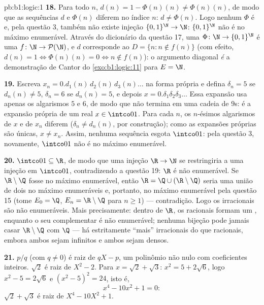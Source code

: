 \begin{solution}{pb:b1:logic:1}
\textbf{18.} Para todo $n$, $d(n) = 1 - \Phi(n)(n) \neq \Phi(n)(n)$,
de modo que as sequências $d$ e $\Phi(n)$ diferem no índice $n$: $d \neq
\Phi(n)$. Logo nenhum $\Phi$ é  e, pela questão 3, também não
existe injeção $\{0,1\}^{\N} \to \N$: $\{0,1\}^{\N}$ não é no
máximo enumerável. Através do dicionário da questão 17, uma 
$\Phi
\colon \N \to \{0,1\}^{\N}$ é uma  $f \colon \N \to
\mathcal{P}(\N)$, e $d$ corresponde ao  $D = \{n : n
\notin f(n)\}$ (com efeito, $d(n) = 1 \iff \Phi(n)(n) = 0 \iff n \notin
f(n)$): o argumento diagonal \emph{é} a demonstração de Cantor do
\cref{exo:b1:logic:11} para $E = \N$.

\textbf{19.} Escreva $x_n = 0.d_1(n)\,d_2(n)\,d_3(n)\dots$ na forma
própria e defina $\delta_n = 5$ se $d_n(n) \neq 5$, $\delta_n = 6$
se $d_n(n) = 5$, e depois $x = 0.\delta_1\delta_2\delta_3\dots$ Essa
expansão usa apenas os algarismos $5$ e $6$, de modo que não termina em
uma cadeia de $9$s: é a expansão própria de um real $x \in \intco01$.
Para cada $n$, os $n$-ésimos algarismos de $x$ e de $x_n$ diferem
($\delta_n \neq d_n(n)$, por construção); como as expansões próprias
são únicas, $x \neq x_n$. Assim, nenhuma sequência esgota $\intco01$: pela
questão 3, novamente, $\intco01$ não é no máximo enumerável.

\textbf{20.} $\intco01 \subseteq \R$, de modo que uma injeção $\R \to \N$
se restringiria a uma injeção em $\intco01$, contradizendo a questão 19:
$\R$ é não enumerável. Se $\R \setminus \Q$ fosse no máximo enumerável,
então $\R = \Q \cup (\R \setminus \Q)$ seria uma união de dois
 no máximo enumeráveis e, portanto, no máximo enumerável pela
questão 15 (tome $E_0 = \Q$, $E_n = \R \setminus \Q$ para $n \geq 1$) ---
contradição. Logo os irracionais são não enumeráveis. Mais precisamente:
dentro de $\R$, os racionais formam um , enquanto o
seu complementar é não enumerável; nenhuma bijeção pode jamais casar
$\R
\setminus \Q$ com $\Q$ --- há estritamente ``mais'' irracionais
do que racionais, embora ambos sejam infinitos e ambos sejam densos.

\textbf{21.} $p/q$ (com $q \neq 0$) é raiz de $qX - p$, um
polinômio não nulo com coeficientes inteiros. $\sqrt 2$ é raiz
de $X^2 - 2$. Para $x = \sqrt 2 + \sqrt 3$: $x^2 = 5 + 2\sqrt 6$, logo
$x^2 - 5 = 2\sqrt 6$ e $(x^2 - 5)^2 = 24$, isto é,
\[
x^4 - 10x^2 + 1 = 0 :
\]
$\sqrt 2 + \sqrt 3$ é raiz de $X^4 - 10X^2 + 1$.


\end{solution}
